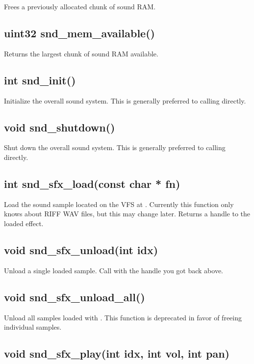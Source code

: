 \documentclass[english]{report}
\begin{document}
Frees a previously allocated chunk of sound RAM.

\subsection{uint32 snd\_mem\_available()}

Returns the largest chunk of sound RAM available.

\subsection{int snd\_init()}

Initialize the overall sound system. This is generally preferred to calling
 directly.

\subsection{void snd\_shutdown()}

Shut down the overall sound system. This is generally preferred to calling
 directly.

\subsection{int snd\_sfx\_load(const char * fn)}

Load the sound sample located on the VFS at . Currently this
function only knows about RIFF WAV files, but this may change later. Returns
a handle to the loaded effect.

\subsection{void snd\_sfx\_unload(int idx)}

Unload a single loaded sample. Call with the handle you got back above.

\subsection{void snd\_sfx\_unload\_all()}

Unload all samples loaded with . This function
is deprecated in favor of freeing individual samples.

\subsection{void snd\_sfx\_play(int idx, int vol, int pan)}
\end{document}
